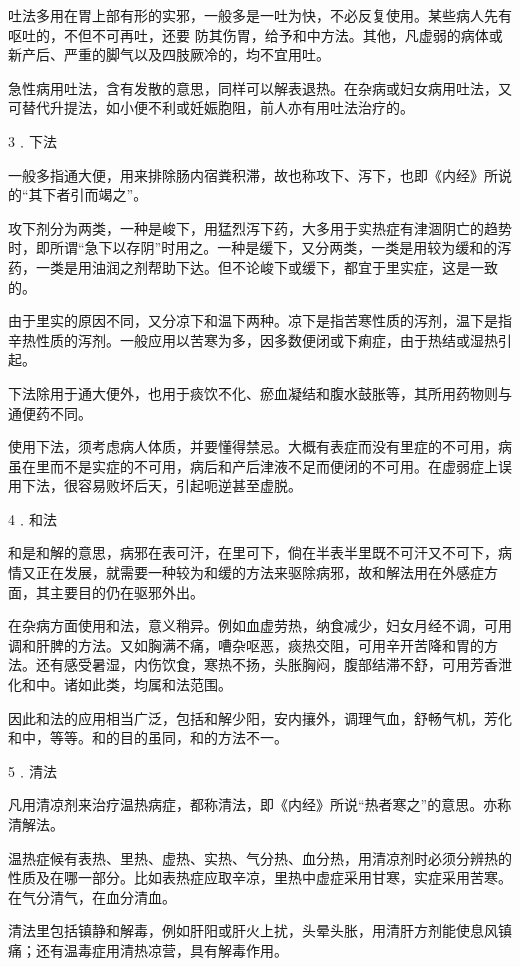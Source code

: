 \documentclass[12pt,UTF8]{ctexbook}
\begin{document}
吐法多用在胃上部有形的实邪，一般多是一吐为快，不必反复使用。某些病人先有呕吐的，不但不可再吐，还要
防其伤胃，给予和中方法。其他，凡虚弱的病体或新产后、严重的脚气以及四肢厥冷的，均不宜用吐。

急性病用吐法，含有发散的意思，同样可以解表退热。在杂病或妇女病用吐法，又可替代升提法，如小便不利或妊娠胞阻，前人亦有用吐法治疗的。

3﹒下法

一般多指通大便，用来排除肠内宿粪积滞，故也称攻下、泻下，也即《内经》所说的“其下者引而竭之”。

攻下剂分为两类，一种是峻下，用猛烈泻下药，大多用于实热症有津涸阴亡的趋势时，即所谓“急下以存阴”时用之。一种是缓下，又分两类，一类是用较为缓和的泻药，一类是用油润之剂帮助下达。但不论峻下或缓下，都宜于里实症，这是一致的。

由于里实的原因不同，又分凉下和温下两种。凉下是指苦寒性质的泻剂，温下是指辛热性质的泻剂。一般应用以苦寒为多，因多数便闭或下痢症，由于热结或湿热引起。

下法除用于通大便外，也用于痰饮不化、瘀血凝结和腹水鼓胀等，其所用药物则与通便药不同。

使用下法，须考虑病人体质，并要懂得禁忌。大概有表症而没有里症的不可用，病虽在里而不是实症的不可用，病后和产后津液不足而便闭的不可用。在虚弱症上误用下法，很容易败坏后天，引起呃逆甚至虚脱。

4﹒和法

和是和解的意思，病邪在表可汗，在里可下，倘在半表半里既不可汗又不可下，病情又正在发展，就需要一种较为和缓的方法来驱除病邪，故和解法用在外感症方面，其主要目的仍在驱邪外出。

在杂病方面使用和法，意义稍异。例如血虚劳热，纳食减少，妇女月经不调，可用调和肝脾的方法。又如胸满不痛，嘈杂呕恶，痰热交阻，可用辛开苦降和胃的方法。还有感受暑湿，内伤饮食，寒热不扬，头胀胸闷，腹部结滞不舒，可用芳香泄化和中。诸如此类，均属和法范围。

因此和法的应用相当广泛，包括和解少阳，安内攘外，调理气血，舒畅气机，芳化和中，等等。和的目的虽同，和的方法不一。

5﹒清法

凡用清凉剂来治疗温热病症，都称清法，即《内经》所说“热者寒之”的意思。亦称清解法。

温热症候有表热、里热、虚热、实热、气分热、血分热，用清凉剂时必须分辨热的性质及在哪一部分。比如表热症应取辛凉，里热中虚症采用甘寒，实症采用苦寒。在气分清气，在血分清血。

清法里包括镇静和解毒，例如肝阳或肝火上扰，头晕头胀，用清肝方剂能使息风镇痛；还有温毒症用清热凉营，具有解毒作用。
\end{document}
